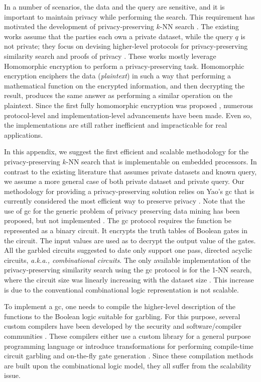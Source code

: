 In a number of scenarios, the data and the query are sensitive, and it is important to maintain privacy while performing the search.
This requirement has motivated the development of privacy-preserving $k$-NN search \cite{shaneck2009privacy}.
The existing works assume that the parties each own a private dataset, while the query $q$ is not private; they focus on devising higher-level protocols for privacy-preserving similarity search and proofs of privacy \cite{shaneck2009privacy,qi2008efficient}.
These works mostly leverage Homomorphic encryption to perform a privacy-preserving task.
Homomorphic encryption enciphers the data (\emph{plaintext}) in such a way that performing a mathematical function on the encrypted information, and then decrypting the result, produces the same answer as performing a similar operation on the plaintext.
Since the first fully homomorphic encryption was proposed \cite{gentry2009fully}, numerous protocol-level and implementation-level advancements have been made.
Even so, the implementations are still rather inefficient and impracticable for real applications.


In this appendix, we suggest the first efficient and scalable methodology for the privacy-preserving $k$-NN search that is implementable on embedded processors.
In contrast to the existing literature that assumes private datasets and known query, we assume a more general case of both private dataset and private query.
Our methodology for providing a privacy-preserving solution relies on Yao's \acrfull{gc} that is currently considered the most efficient way to preserve privacy \cite{huang2012private,brenner2011hcrypt}.
Note that the use of \acrshort{gc} for the generic problem of privacy preserving data mining has been proposed, but not implemented \cite{agrawal2000privacy}.
The \acrshort{gc} protocol requires the function be represented as a binary circuit.
It encrypts the truth tables of Boolean gates in the circuit.
The input values are used as to decrypt the output value of the gates.
All the garbled circuits suggested to date only support one pass, directed acyclic circuits, \emph{a.k.a., combinational circuits}.
The only available implementation of the privacy-preserving similarity search using the \acrshort{gc} protocol is for the 1-NN search, where the circuit size was linearly increasing with the dataset size \cite{kolesnikov2009improved}.
This increase is due to the conventional combinational logic representation is not scalable.

To implement a \acrshort{gc}, one needs to compile the higher-level description of the functions to the Boolean logic suitable for garbling.
For this purpose, several custom compilers have been developed by the security and software/compiler communities \cite{malkhi2004fairplay,henecka2010tasty,holzer2012secure,kreuter2013pcf}.
These compilers either use a custom library for a general purpose programming language \cite{malkhi2004fairplay} or introduce transformations for performing compile-time circuit garbling and on-the-fly gate generation \cite{kreuter2013pcf}.
Since these compilation methods are built upon the combinational logic model, they all suffer from the scalability issue.

